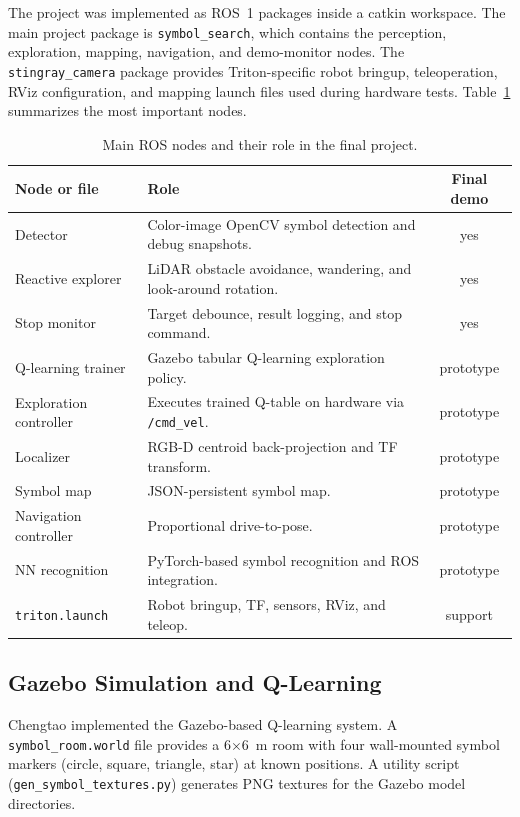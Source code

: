 \documentclass[letterpaper, 10 pt, conference]{ieeeconf/ieeeconf}
\begin{document}
The project was implemented as ROS~1 packages inside a catkin workspace.
The main project package is \texttt{symbol\_search}, which contains the
perception, exploration, mapping, navigation, and demo-monitor nodes.
The \texttt{stingray\_camera} package provides Triton-specific robot bringup,
teleoperation, RViz configuration, and mapping launch files used during
hardware tests.
Table~\ref{tab:nodes} summarizes the most important nodes.

\begin{table}[h]
\centering
\caption{Main ROS nodes and their role in the final project.}
\label{tab:nodes}
\renewcommand{\arraystretch}{1.12}
\scriptsize
\begin{tabular}{@{}p{2.15cm} p{4.1cm} c@{}}
\toprule
\textbf{Node or file} & \textbf{Role} & \textbf{Final demo} \\
\midrule
Detector
  & Color-image OpenCV symbol detection and debug snapshots.
  & yes \\
Reactive explorer
  & LiDAR obstacle avoidance, wandering, and look-around rotation.
  & yes \\
Stop monitor
  & Target debounce, result logging, and stop command.
  & yes \\
Q-learning trainer
  & Gazebo tabular Q-learning exploration policy.
  & prototype \\
Exploration controller
  & Executes trained Q-table on hardware via \texttt{/cmd\_vel}.
  & prototype \\
Localizer
  & RGB-D centroid back-projection and TF transform.
  & prototype \\
Symbol map
  & JSON-persistent symbol map.
  & prototype \\
Navigation controller
  & Proportional drive-to-pose.
  & prototype \\
NN recognition
  & PyTorch-based symbol recognition and ROS integration.
  & prototype \\
\texttt{triton.launch}
  & Robot bringup, TF, sensors, RViz, and teleop.
  & support \\
\bottomrule
\end{tabular}
\end{table}

\subsection{Gazebo Simulation and Q-Learning}

Chengtao implemented the Gazebo-based Q-learning system.
A \texttt{symbol\_room.world} file provides a 6$\times$6~m room with four
wall-mounted symbol markers (circle, square, triangle, star) at known positions.
A utility script (\texttt{gen\_symbol\_textures.py}) generates PNG textures for
the Gazebo model directories.
\end{document}
